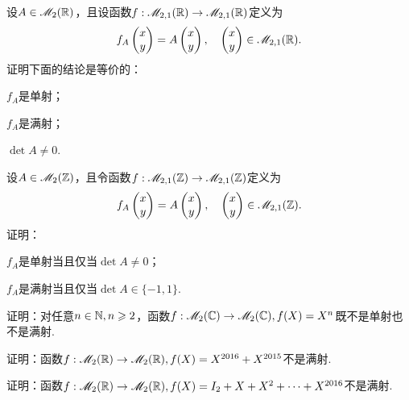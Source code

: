 \begin{problem}
  设$A\in\mathscr M_2(\mathbb R)$，且设函数$f:\mathscr M_{2,1}(\mathbb R)\to\mathscr M_{2,1}(\mathbb R)$定义为
  \[
    f_A\begin{pmatrix}
      x \\ y
    \end{pmatrix} = A\begin{pmatrix}
      x \\ y
    \end{pmatrix},\quad \begin{pmatrix}
      x \\ y
    \end{pmatrix} \in\mathscr M_{2,1}(\mathbb R).
  \]
  证明下面的结论是等价的：
  \begin{enum}
    \item\label{prob2.37a} $f_A$是单射；
    \item\label{prob2.37b} $f_A$是满射；
    \item\label{prob2.37c} $\det A\ne0$.
  \end{enum}
\end{problem}

\begin{problem}
  设$A\in\mathscr M_2(\mathbb Z)$，且令函数$f:\mathscr M_{2,1}(\mathbb Z)\to\mathscr M_{2,1}(\mathbb Z)$定义为
  \[
    f_A\begin{pmatrix}
      x \\ y
    \end{pmatrix} = A\begin{pmatrix}
      x \\ y
    \end{pmatrix},\quad \begin{pmatrix}
      x \\ y
    \end{pmatrix} \in\mathscr M_{2,1}(\mathbb Z).
  \]
  证明：
  \begin{enum}
    \item $f_A$是单射当且仅当$\det A\ne0$；
    \item $f_A$是满射当且仅当$\det A\in\{-1,1\}$.
  \end{enum}
\end{problem}

\begin{problem}

  证明：对任意$n\in\mathbb N,n\geqslant2$，函数$f:\mathscr M_2(\mathbb C)\to\mathscr M_2(\mathbb C),f(X)=X^n$既不是单射也不是满射.
\end{problem}

\begin{problem}
  \begin{enum}
    \item 证明：函数$f:\mathscr M_2(\mathbb R)\to\mathscr M_2(\mathbb R),f(X)=X^{2016}+X^{2015}$不是满射.
    \item 证明：函数$f:\mathscr M_2(\mathbb R)\to\mathscr M_2(\mathbb R),f(X)=I_2+X+X^2
        +\cdots+X^{2016} $不是满射.
  \end{enum}
\end{problem}

